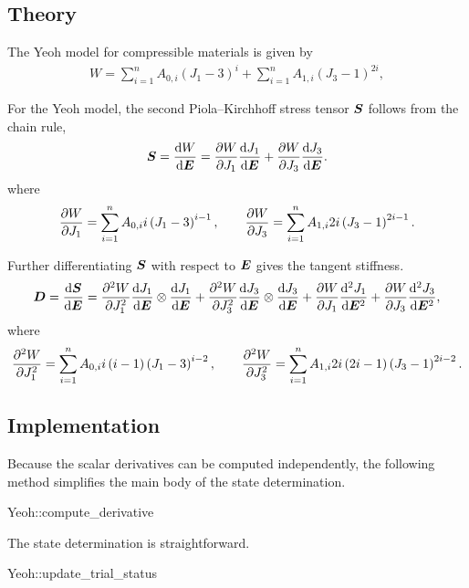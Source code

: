 \subsection{Theory}
The Yeoh model for compressible materials is given by
\begin{gather}
    W=\sum_{i=1}^nA_{0,i}\left(J_1-3\right)^i+\sum_{i=1}^nA_{1,i}\left(J_3-1\right)^{2i},
\end{gather}

For the Yeoh model, the second Piola--Kirchhoff stress tensor $\bm{S}$ follows from the chain rule,
\begin{gather}
    \bm{S}=\dfrac{\mathrm{d}W}{\mathrm{d}\bm{E}}=\dfrac{\partial{W}}{\partial{J_1}}\dfrac{\mathrm{d}J_1}{\mathrm{d}\bm{E}}+\dfrac{\partial{W}}{\partial{J_3}}\dfrac{\mathrm{d}J_3}{\mathrm{d}\bm{E}}.
\end{gather}
where
\begin{gather}
    \dfrac{\partial{W}}{\partial{J_1}}=\sum_{i=1}^nA_{0,i}i\left(J_1-3\right)^{i-1},\qquad
    \dfrac{\partial{W}}{\partial{J_3}}=\sum_{i=1}^nA_{1,i}2i\left(J_3-1\right)^{2i-1}.
\end{gather}

Further differentiating $\bm{S}$ with respect to $\bm{E}$ gives the tangent stiffness.
\begin{gather}
    \bm{D}=\dfrac{\mathrm{d}\bm{S}}{\mathrm{d}\bm{E}}=\dfrac{\partial{^2W}}{\partial{J_1^2}}\dfrac{\mathrm{d}J_1}{\mathrm{d}\bm{E}}\otimes\dfrac{\mathrm{d}J_1}{\mathrm{d}\bm{E}}+\dfrac{\partial{^2W}}{\partial{J_3^2}}\dfrac{\mathrm{d}J_3}{\mathrm{d}\bm{E}}\otimes\dfrac{\mathrm{d}J_3}{\mathrm{d}\bm{E}}+\dfrac{\partial{W}}{\partial{J_1}}\dfrac{\mathrm{d}^2J_1}{\mathrm{d}\bm{E}^2}+\dfrac{\partial{W}}{\partial{J_3}}\dfrac{\mathrm{d}^2J_3}{\mathrm{d}\bm{E}^2},
\end{gather}
where
\begin{gather}
    \dfrac{\partial{^2W}}{\partial{J_1^2}}=\sum_{i=1}^nA_{0,i}i\left(i-1\right)\left(J_1-3\right)^{i-2},\qquad
    \dfrac{\partial{^2W}}{\partial{J_3^2}}=\sum_{i=1}^nA_{1,i}2i\left(2i-1\right)\left(J_3-1\right)^{2i-2}.
\end{gather}
\subsection{Implementation}
Because the scalar derivatives can be computed independently, the following method simplifies the main body of the state determination.
\begin{cppcode}
Yeoh::compute_derivative
\end{cppcode}

The state determination is straightforward.
\begin{cppcode}
Yeoh::update_trial_status
\end{cppcode}
